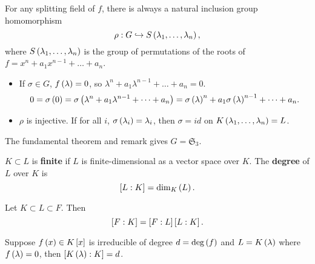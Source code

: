 \begin{remark*}
For any splitting field of $ f $, there is always a natural inclusion group homomorphism
$$ \rho : G \hookrightarrow S\rb{\lambda_1, \dots, \lambda_n}, $$
where $ S\rb{\lambda_1, \dots, \lambda_n} $ is the group of permutations of the roots of $ f = x^n + a_1x^{n - 1} + \dots + a_n $.
\begin{itemize}
\item If $ \sigma \in G $, $ f\rb{\lambda} = 0 $, so $ \lambda^n + a_1\lambda^{n - 1} + \dots + a_n = 0 $.
$$ 0 = \sigma\rb{0} = \sigma\rb{\lambda^n + a_1\lambda^{n - 1} + \dots + a_n} = \sigma\rb{\lambda}^n + a_1\sigma\rb{\lambda}^{n - 1} + \dots + a_n. $$
\item $ \rho $ is injective. If for all $ i $, $ \sigma\rb{\lambda_i} = \lambda_i $, then $ \sigma = id $ on $ K\rb{\lambda_1, \dots, \lambda_n} = L $.
\end{itemize}
\end{remark*}

The fundamental theorem and remark gives $ G = \mathfrak{S}_3 $.


\begin{definition}
$ K \subset L $ is \textbf{finite} if $ L $ is finite-dimensional as a vector space over $ K $. The \textbf{degree} of $ L $ over $ K $ is
$$ \sb{L : K} = \dim_{K}\rb{L}. $$
\end{definition}

\begin{theorem}
\label{thm:towerlaw}
Let $ K \subset L \subset F $. Then
$$ \sb{F : K} = \sb{F : L}\sb{L : K}. $$
\end{theorem}

\begin{theorem}
\label{thm:degree}
Suppose $ f\rb{x} \in K\sb{x} $ is irreducible of degree $ d = \deg\rb{f} $ and $ L = K\rb{\lambda} $ where $ f\rb{\lambda} = 0 $, then $ \sb{K\rb{\lambda} : K} = d $.
\end{theorem}


